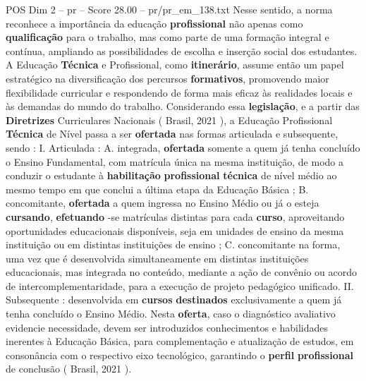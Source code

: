 \begin{textsample}{POS Dim 2 – pr – Score 28.00 – pr/pr\_em\_138.txt}
Nesse sentido, a norma reconhece a importância da educação \textbf{profissional} não apenas como \textbf{qualificação} para o trabalho, mas como parte de uma formação integral e contínua, ampliando as possibilidades de escolha e inserção social dos estudantes.
A Educação \textbf{Técnica} e Profissional, como \textbf{itinerário}, assume então um papel estratégico na diversificação dos percursos \textbf{formativos}, promovendo maior flexibilidade curricular e respondendo de forma mais eficaz às realidades locais e às demandas do mundo do trabalho.
Considerando essa \textbf{legislação}, e a partir das \textbf{Diretrizes} Curriculares Nacionais ( Brasil, 2021 ), a Educação Profissional \textbf{Técnica} de Nível passa a ser \textbf{ofertada} nas formas articulada e subsequente, sendo : I.
Articulada : A. integrada, \textbf{ofertada} somente a quem já tenha concluído o Ensino Fundamental, com matrícula única na mesma instituição, de modo a conduzir o estudante à \textbf{habilitação} \textbf{profissional} \textbf{técnica} de nível médio ao mesmo tempo em que conclui a última etapa da Educação Básica ; B. concomitante, \textbf{ofertada} a quem ingressa no Ensino Médio ou já o esteja \textbf{cursando}, \textbf{efetuando} -se matrículas distintas para cada \textbf{curso}, aproveitando oportunidades educacionais disponíveis, seja em unidades de ensino da mesma instituição ou em distintas instituições de ensino ; C. concomitante na forma, uma vez que é desenvolvida simultaneamente em distintas instituições educacionais, mas integrada no conteúdo, mediante a ação de convênio ou acordo de intercomplementaridade, para a execução de projeto pedagógico unificado.
II.
Subsequente : desenvolvida em \textbf{cursos} \textbf{destinados} exclusivamente a quem já tenha concluído o Ensino Médio.
Nesta \textbf{oferta}, caso o diagnóstico avaliativo evidencie necessidade, devem ser introduzidos conhecimentos e habilidades inerentes à Educação Básica, para complementação e atualização de estudos, em consonância com o respectivo eixo tecnológico, garantindo o \textbf{perfil} \textbf{profissional} de conclusão ( Brasil, 2021 ).

\end{textsample}
